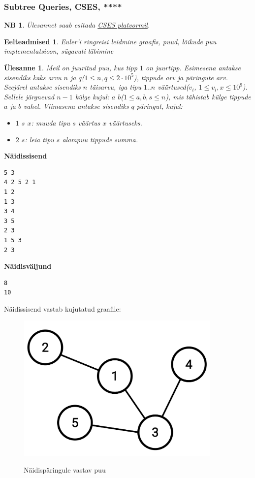 \documentclass{trkut}
\newtheorem*{prereq}{Eelteadmised}
\newtheorem*{extra}{NB}
\newtheorem*{Text}{Ülesanne}
\begin{document}
\subsubsection{Subtree Queries, CSES, ****}
\begin{extra}
Ülesannet saab esitada \href{https://cses.fi/problemset/task/1137}{CSES platvormil}.
\end{extra}
\begin{prereq} 
Euler'i ringreisi leidmine graafis, puud, lõikude puu implementatsioon, sügavuti läbimine
\end{prereq}
\begin{Text}
Meil on juuritud puu, kus tipp $1$ on juurtipp. 
Esimesena antakse sisendiks kaks arvu $n$ ja $q$($1\le n,q\le 2\cdot10^5$), tippude arv ja päringute arv.
Seejärel antakse sisendiks $n$ täisarvu, iga tipu $1..n$ väärtused($v_i$, $1\le v_i,x\le 10^9$).
Sellele järgnevad $n-1$ külge kujul: $a$ $b$($1\le a,b,s\le n$), mis tähistab külge tippude $a$ ja $b$ vahel.
Viimasena antakse sisendiks $q$ päringut, kujul:
\begin{itemize}
\item $1$ $s$ $x$: muuda tipu $s$ väärtus $x$ väärtuseks. 
\item $2$ $s$: leia tipu $s$ alampuu tippude summa.
\end{itemize}

\parencite{13}
\end{Text}



\textbf{Näidissisend}

\begin{verbatim}
5 3
4 2 5 2 1
1 2
1 3
3 4
3 5
2 3
1 5 3
2 3
\end{verbatim}

\textbf{Näidisväljund}

\begin{verbatim}
8
10
\end{verbatim}



Näidissisend vastab kujutatud graafile:
\begin{figure}[H]%
    \includegraphics[width=10cm]{ntpuu.jpeg}%
    \caption{Näidispäringule vastav puu}%
    \label{joonis}%
\end{figure}
\end{document}
